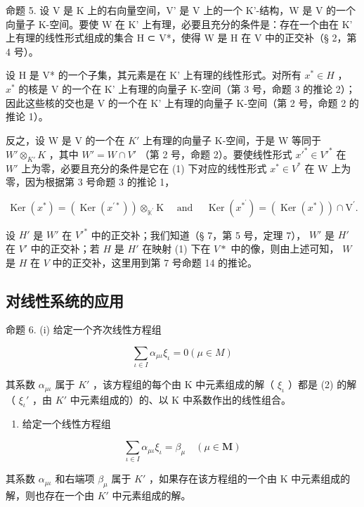 命题 5. 设 V 是 K 上的右向量空间，V' 是 V 上的一个 K'-结构，W 是 V 的一个向量子 K-空间。要使 W 在 K' 上有理，必要且充分的条件是：存在一个由在 K' 上有理的线性形式组成的集合 H ⊂ V*，使得 W 是 H 在 V 中的正交补（§ 2，第 4 号）。

设 H 是 V* 的一个子集，其元素是在 K' 上有理的线性形式。对所有 \(x^{*} \in H\) ， \(x^{*}\) 的核是 V 的一个在 K' 上有理的向量子 K-空间（第 3 号，命题 3 的推论 2）；因此这些核的交也是 V 的一个在 K' 上有理的向量子 K-空间（第 2 号，命题 2 的推论 1）。

反之，设 W 是 V 的一个在 \(K'\) 上有理的向量子 K-空间，于是 W 等同于 \(W' \otimes_{K'} K\) ，其中 \(W' = W \cap V'\) （第 2 号，命题 2）。要使线性形式 \(x'^* \in V'^*\) 在 \(W'\) 上为零，必要且充分的条件是它在 (1) 下对应的线性形式 \(x^* \in V^*\) 在 W 上为零，因为根据第 3 号命题 3 的推论 1，

\[
\operatorname{Ker} (x ^ {*}) = \left(\operatorname{Ker} (x ^ {\prime *})\right) \otimes_ {\mathbb {K} ^ {\prime}} \mathrm{K} \quad \text { and } \quad \operatorname{Ker} (x ^ {* ^ {\prime}}) = (\operatorname{Ker} (x ^ {*})) \cap \mathrm{V} ^ {\prime}.
\]

设 \(H'\) 是 \(W'\) 在 \(V'^*\) 中的正交补；我们知道（§ 7，第 5 号，定理 7）， \(W'\) 是 \(H'\) 在 \(V'\) 中的正交补；若 \(H\) 是 \(H'\) 在映射 (1) 下在 \(V*\) 中的像，则由上述可知， \(W\) 是 \(H\) 在 \(V\) 中的正交补，这里用到第 7 号命题 14 的推论。

\subsection{对线性系统的应用}

命题 6. (i) 给定一个齐次线性方程组

\[
\sum_ {\iota \in I} \alpha_ {\mu \iota} \xi_ {\iota} = 0 (\mu \in M)\tag{2}
\]

其系数 \(\alpha_{\mu \iota}\) 属于 \(K'\) ，该方程组的每个由 K 中元素组成的解（ \(\xi_{\iota}\) ）都是 (2) 的解（ \(\xi_{\iota}'\) ，由 \(K'\) 中元素组成的）的、以 K 中系数作出的线性组合。

\begin{enumerate}
\def\labelenumi{(\roman{enumi})}
\setcounter{enumi}{1}
\tightlist
\item
  给定一个线性方程组
\end{enumerate}

\[
\sum_ {\iota \in I} \alpha_ {\mu \iota} \xi_ {\iota} = \beta_ {\mu} \quad (\mu \in \mathbf {M})\tag{3}
\]

其系数 \(\alpha_{\mu \iota}\) 和右端项 \(\beta_{\mu}\) 属于 \(K'\) ，如果存在该方程组的一个由 K 中元素组成的解，则也存在一个由 \(K'\) 中元素组成的解。

